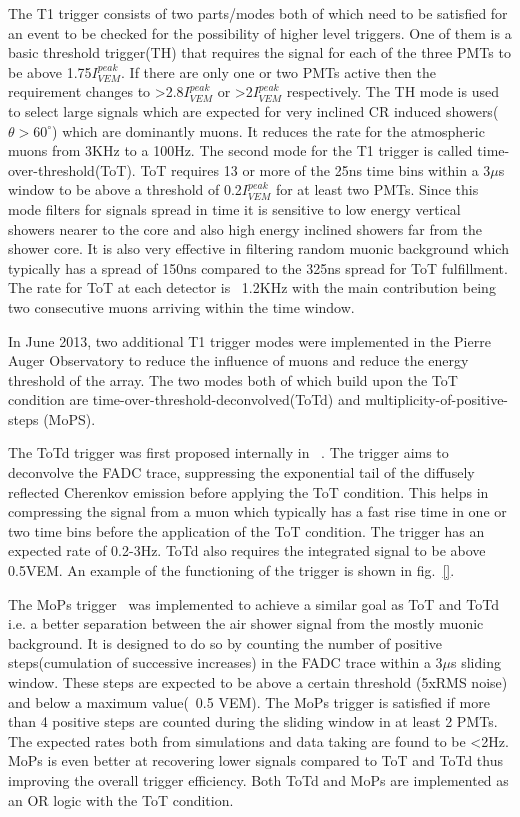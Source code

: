 The T1 trigger consists of two parts/modes both of which need to be satisfied for an event to be checked for the possibility of higher level triggers. One of them is a basic threshold trigger(TH) that requires the signal for each of the three PMTs to be above 1.75$I_{VEM}^{peak}$. If there are only one or two PMTs active then the requirement changes to >2.8$I_{VEM}^{peak}$ or >2$I_{VEM}^{peak}$ respectively. The TH mode is used to select large signals which are expected for very inclined CR induced showers($\theta >60^{\circ}$) which are dominantly muons. It reduces the rate for the atmospheric muons from 3KHz to a 100Hz. The second mode for the T1 trigger is called time-over-threshold(ToT). ToT requires 13 or more of the 25ns time bins within a 3$\mu$s window to be above a threshold of 0.2$I_{VEM}^{peak}$ for at least two PMTs. Since this mode filters for signals spread in time it is sensitive to low energy vertical showers nearer to the core and also high energy inclined showers far from the shower core. It is also very effective in filtering random muonic background which typically has a spread of 150ns compared to the 325ns spread for ToT fulfillment. The rate for ToT at each detector is ~1.2KHz with the main contribution being two consecutive muons arriving within the time window. 


In June 2013, two additional T1 trigger modes were implemented in the Pierre Auger Observatory to reduce the influence of muons and reduce the energy threshold of the array. The two modes both of which build upon the ToT condition are time-over-threshold-deconvolved(ToTd) and multiplicity-of-positive-steps (MoPS).

The ToTd trigger was first proposed internally in ~\cite{}. The trigger aims to deconvolve the FADC trace, suppressing the exponential tail of the diffusely reflected Cherenkov emission before applying the ToT condition. This helps in compressing the signal from a muon which typically has a fast rise time in one or two time bins before the application of the ToT condition. The trigger has an expected rate of 0.2-3Hz. ToTd also requires the integrated signal to be above 0.5VEM. An example of the functioning of the trigger is shown in fig.~\ref{}. 

The MoPs trigger~\cite{} was implemented to achieve a similar goal as ToT and ToTd i.e. a better separation between the air shower signal from the mostly muonic background. It is designed to do so by counting the number of positive steps(cumulation of successive increases) in the FADC trace within a 3$\mu$s sliding window. These steps are expected to be above a certain threshold (5xRMS noise) and below a maximum value(~0.5 VEM). The MoPs trigger is satisfied if more than 4 positive steps are counted during the sliding window in at least 2 PMTs. The expected rates both from simulations and data taking are found to be <2Hz. MoPs is even better at recovering lower signals compared to ToT and ToTd thus improving the overall trigger efficiency. Both ToTd and MoPs are implemented as an OR logic with the ToT condition. 

